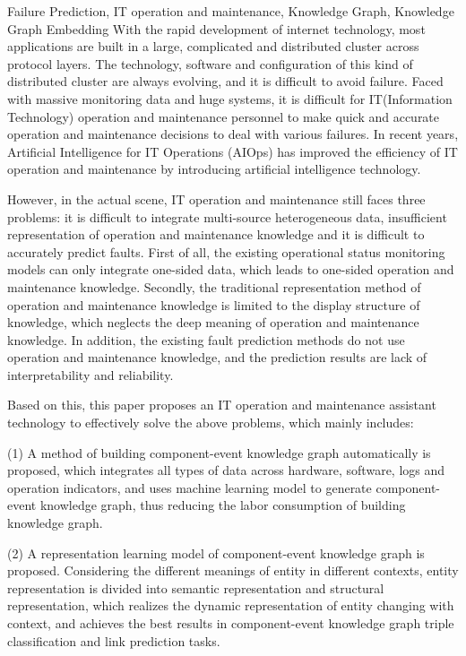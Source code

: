 
\begin{englishabstract}{Failure Prediction, IT operation and maintenance, Knowledge Graph, Knowledge Graph Embedding}
With the rapid development of internet technology, most applications are built in a large, complicated and distributed cluster across protocol layers. The technology, software and configuration of this kind of distributed cluster are always evolving, and it is difficult to avoid failure. Faced with massive monitoring data and huge systems, it is difficult for IT(Information Technology) operation and maintenance personnel to make quick and accurate operation and maintenance decisions to deal with various failures. In recent years, Artificial Intelligence for IT Operations (AIOps) has improved the efficiency of IT operation and maintenance by introducing artificial intelligence technology. 

However, in the actual scene, IT operation and maintenance still faces three problems: it is difficult to integrate multi-source heterogeneous data, insufficient representation of operation and maintenance knowledge and it is difficult to accurately predict faults. First of all, the existing operational status monitoring models can only integrate one-sided data, which leads to one-sided operation and maintenance knowledge. Secondly, the traditional representation method of operation and maintenance knowledge is limited to the display structure of knowledge, which neglects the deep meaning of operation and maintenance knowledge. In addition, the existing fault prediction methods do not use operation and maintenance knowledge, and the prediction results are lack of interpretability and reliability.

Based on this, this paper proposes an IT operation and maintenance assistant technology to effectively solve the above problems, which mainly includes: 

(1) A method of building component-event knowledge graph automatically is proposed, which integrates all types of data across hardware, software, logs and operation indicators, and uses machine learning model to generate component-event knowledge graph, thus reducing the labor consumption of building knowledge graph.

(2) A representation learning model of component-event knowledge graph is proposed. Considering the different meanings of entity in different contexts, entity representation is divided into semantic representation and structural representation, which realizes the dynamic representation of entity changing with context, and achieves the best results in component-event knowledge graph triple classification and link prediction tasks. 


\end{englishabstract}
